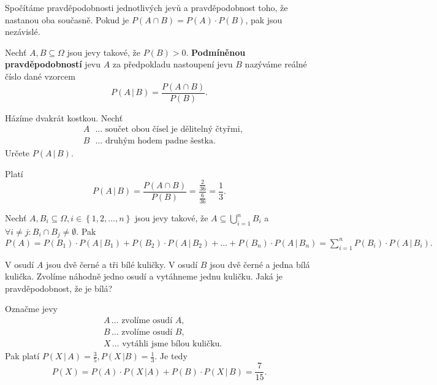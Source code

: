 \begin{reseni}
Spočítáme pravděpodobnosti jednotlivých jevů a pravděpodobnost toho, že nastanou
oba současně. Pokud je $P(A\cap B)=P(A)\cdot P(B)$, pak jsou nezávislé.
\end{reseni}

\begin{definition}
    Nechť $A,B\subseteq \Omega$ jsou jevy takové, že $P(B)>0.$ \textbf{Podmíněnou
    pravděpodobností} jevu $A$ za předpokladu nastoupení jevu $B$ nazýváme reálné
    číslo dané vzorcem
    $$P(A\, | \, B) = \frac{P(A\cap B)}{P(B)}.$$
\end{definition}

\begin{priklad}
Házíme dvakrát kostkou. Nechť
\begin{align*}
    &A \textrm{ } \dots  \textrm{ součet obou čísel je dělitelný čtyřmi,}\\
    &B \textrm{ } \dots  \textrm{ druhým hodem padne šestka}.
\end{align*}
Určete $P(A\, |\, B).$
\end{priklad}

\begin{reseni}
Platí
$$P(A\, |\, B)=\frac{P(A\cap B)}{P(B)}=\frac{\frac{2}{36}}{\frac{6}{36}}=\frac{1}{3}.$$
\end{reseni}

\begin{veta}
    Nechť $A,B_i \subseteq \Omega, i \in \left \{ 1, 2, \dots, n \right \} $ jsou jevy
    takové, že $A\subseteq \bigcup_{i=1}^n B_i$ a $\forall i\ne j: B_i\cap B_j\ne
    \emptyset.$ Pak $P(A)=P(B_1)\cdot P(A\, |\, B_1) + P(B_2)\cdot P(A \, |\, B_2)+
    \dots + P(B_n)\cdot P(A \,|\, B_n)=\sum_{i=1}^n P(B_i)\cdot P(A\, |\, B_i).$
\end{veta}

\begin{priklad}
V osudí $A$ jsou dvě černé a tři bílé kuličky. V osudí $B$ jsou dvě černé a jedna
bílá kulička. Zvolíme náhodně jedno osudí a vytáhneme jednu kuličku. Jaká
je pravděpodobnost, že je bílá?
\end{priklad}

\begin{reseni}
Označme jevy
\begin{align*}
    &A \,\dots  \textrm{ zvolíme osudí } A,\\
    &B\,\dots  \textrm{ zvolíme osudí } B,\\
    &X\,\dots  \textrm{ vytáhli jsme bílou kuličku}.
\end{align*}
Pak platí
$P(X \, | \, A) = \frac{3}{5}, P(X \, | B)=\frac{1}{3}.$ Je tedy
$$P(X)=P(A)\cdot P(X \, | A)+P(B)\cdot P(X\, | \, B)=\frac{7}{15}.$$
\end{reseni}

